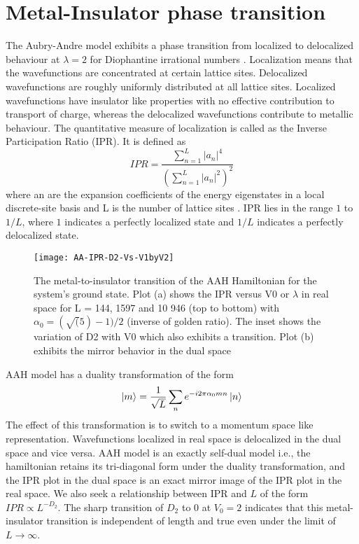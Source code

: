 \section{Metal-Insulator phase transition}
The Aubry-Andre model exhibits a phase transition from localized to delocalized behaviour at $\lambda = 2$ for Diophantine irrational numbers \cite{aulbach2004phase,aubry1980analyticity,jitomirskaya1999metal}. Localization means that the wavefunctions are concentrated at
certain lattice sites. Delocalized wavefunctions are roughly uniformly distributed at all lattice sites. Localized wavefunctions have insulator like properties with no effective
contribution to transport of charge, whereas the delocalized wavefunctions contribute to metallic behaviour. The quantitative measure of localization is called as the Inverse Participation Ratio (IPR).
It is defined as 
\begin{equation}
 IPR = \frac{\sum_{n=1}^{L} |a_{n}|^4} {(\sum_{n=1}^{L} |a_{n}|^2)^2}
\end{equation} where an are the expansion coefficients of the energy eigenstates in a local discrete-site basis and L is the number of lattice sites \cite{mishra2016phase, aulbach2004phase, aubry1980analyticity}.
IPR lies in the range $1$ to $1/L$, where $1$ indicates a perfectly localized state and $1/L$ indicates a perfectly delocalized state.

\begin{figure}[h]
\caption{ The metal-to-insulator transition of the
AAH Hamiltonian for the system’s ground state. Plot (a) shows the
IPR versus V0 or $\lambda$ in real space for L = 144, 1597 and 10 946 (top to
bottom) with $\alpha_0 = (\sqrt(5)-1)/2$ (inverse of golden ratio). The inset shows the variation of D2 with V0 which also
exhibits a transition. Plot (b) exhibits the mirror behavior in the dual
space}
\texttt{[image: AA-IPR-D2-Vs-V1byV2]}
\centering
\end{figure}
AAH model has a duality transformation of the form \cite{aubry1980analyticity,aulbach2004phase,mishra2016phase}
\begin{equation}
 \ket{m} = \frac{1}{\sqrt{L}}\sum_{n}e^{-i2\pi\alpha_0 m n} \ket{n}
\end{equation} The effect of this transformation is to switch to a momentum space like representation. Wavefunctions localized in real space is delocalized in the dual space and vice versa.
AAH model is an exactly self-dual model i.e., the hamiltonian retains its tri-diagonal form under the duality transformation, and the IPR plot in the dual space is an
exact mirror image of the IPR plot in the real space.
We also seek a relationship between IPR and $L$ of the form $IPR \propto L^{-D_2}$. The sharp transition of $D_2$ to 0 at $V_0 = 2$ indicates that this metal-insulator transition
is independent of length and true even under the limit of $L \rightarrow \infty$.


